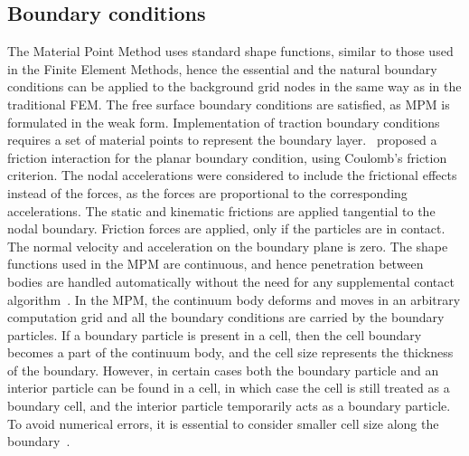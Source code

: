 \subsection{Boundary conditions}
The Material Point Method uses standard shape functions, similar to those used 
in the Finite Element Methods, hence the essential and the natural boundary 
conditions can be applied to the background grid nodes in the same way as in 
the traditional FEM. The free surface boundary conditions are satisfied, as MPM 
is formulated in the weak form. Implementation of traction boundary conditions 
requires a set of material points to represent the boundary 
layer.~\citet{Bandara2009} proposed a friction interaction for the planar 
boundary condition, using Coulomb's friction criterion. The nodal accelerations 
were considered to include the frictional effects instead of the forces, as the 
forces are proportional to the corresponding accelerations. The static and 
kinematic frictions are applied tangential to the nodal boundary. Friction 
forces are applied, only if the particles are in contact. The normal velocity 
and acceleration on the boundary plane is zero. The shape functions used in the 
MPM are continuous, and hence penetration between bodies are handled 
automatically without the need for any supplemental contact 
algorithm~\citep{Chen2002}. In the MPM, the continuum body deforms and moves in 
an arbitrary computation grid and all the boundary conditions are carried by 
the boundary particles. If a boundary particle is present in a cell, then the 
cell boundary becomes a part of the continuum body, and the cell size 
represents the thickness of the boundary. However, in certain cases both the 
boundary particle and an interior particle can be found in a cell, in which 
case the cell is still treated as a boundary cell, and the interior particle 
temporarily acts as a boundary particle. To avoid numerical errors, it is 
essential to consider smaller cell size along the boundary~\citep{Chen2002}. 

